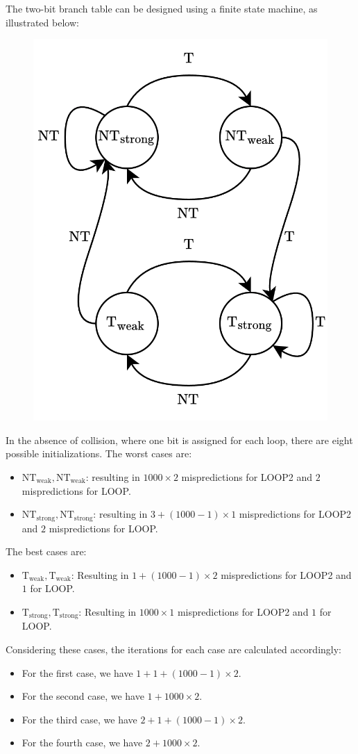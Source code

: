 The two-bit branch table can be designed using a finite state machine, as illustrated below:
\begin{figure}[H]
    \centering
    \includegraphics[width=0.4\linewidth]{images/2bht.png}
\end{figure}
In the absence of collision, where one bit is assigned for each loop, there are eight possible initializations.
The worst cases are:
\begin{itemize}
    \item $\text{NT}_{\text{weak}},\text{NT}_{\text{weak}}$: resulting in $1000 \times 2$ mispredictions for LOOP2 and $2$ mispredictions for LOOP.\@
    \item $\text{NT}_{\text{strong}},\text{NT}_{\text{strong}}$: resulting in $3+(1000-1)\times 1$ mispredictions for LOOP2 and $2$ mispredictions for LOOP.\@
\end{itemize}
The best cases are: 
\begin{itemize}
    \item $\text{T}_{\text{weak}},\text{T}_{\text{weak}}$: Resulting in $1 + (1000-1) \times 2$ mispredictions for LOOP2 and $1$ for LOOP.\@
    \item $\text{T}_{\text{strong}},\text{T}_{\text{strong}}$: Resulting in $1000 \times 1$ mispredictions for LOOP2 and $1$ for LOOP.\@
\end{itemize}

Considering these cases, the iterations for each case are calculated accordingly:
\begin{itemize}
    \item For the first case, we have $1 + 1 + (1000-1) \times 2$.
    \item For the second case, we have $1 +1000 \times 2$.
    \item For the third case, we have $2 + 1 + (1000-1) \times 2$.
    \item For the fourth case, we have $2 +1000 \times 2$.
\end{itemize}

